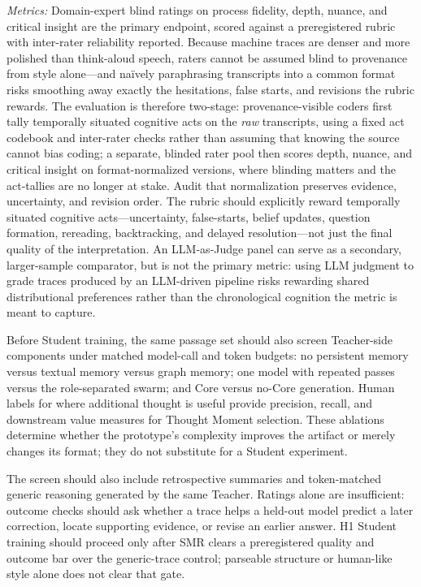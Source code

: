 \emph{Metrics:} Domain-expert blind ratings on process fidelity, depth,
nuance, and critical insight are the primary endpoint, scored against a
preregistered rubric with inter-rater reliability reported. Because machine
traces are denser and more polished than think-aloud speech, raters cannot be
assumed blind to provenance from style alone---and na\"ively paraphrasing
transcripts into a common format risks smoothing away exactly the hesitations,
false starts, and revisions the rubric rewards. The evaluation is therefore
two-stage: provenance-visible coders first tally temporally situated cognitive
acts on the \emph{raw} transcripts, using a fixed act codebook and inter-rater checks rather than assuming
that knowing the source cannot bias coding; a separate, blinded rater pool then scores depth, nuance, and critical
insight on format-normalized versions, where blinding matters and the
act-tallies are no longer at stake. Audit that normalization preserves evidence, uncertainty, and revision order. The rubric should
explicitly reward temporally situated cognitive acts---uncertainty,
false-starts, belief updates, question formation, rereading, backtracking, and
delayed resolution---not just the final quality of the interpretation. An
LLM-as-Judge panel can serve
as a secondary, larger-sample comparator, but is not the primary metric: using
LLM judgment to grade traces produced by an LLM-driven pipeline risks rewarding
shared distributional preferences rather than the chronological cognition the
metric is meant to capture.

Before Student training, the same passage set should also screen Teacher-side
components under matched model-call and token budgets: no persistent memory
versus textual memory versus graph memory; one model with repeated passes versus
the role-separated swarm; and Core versus no-Core generation. Human labels for
where additional thought is useful provide precision, recall, and downstream
value measures for Thought Moment selection. These ablations determine whether
the prototype's complexity improves the artifact or merely changes its format;
they do not substitute for a Student experiment.

The screen should also include retrospective summaries and token-matched generic
reasoning generated by the same Teacher. Ratings alone are insufficient:
outcome checks should ask whether a trace helps a held-out model predict a later
correction, locate supporting evidence, or revise an earlier answer. H1 Student
training should proceed only after SMR clears a preregistered quality and outcome
bar over the generic-trace control; parseable structure or human-like style
alone does not clear that gate.

